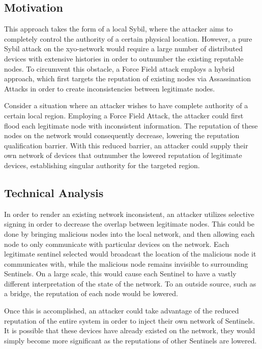 \documentclass{article}
\begin{document}
\subsection{Motivation}

This approach takes the form of a local Sybil, where the attacker aims to completely control the authority of a certain physical location. However, a pure Sybil attack on the \Gls{xyo-network} would require a large number of distributed devices with extensive histories in order to outnumber the existing reputable nodes. To circumvent this obstacle, a Force Field attack employs a hybrid approach, which first targets the reputation of existing nodes via Assassination Attacks in order to create inconsistencies between legitimate nodes.

Consider a situation where an attacker wishes to have complete authority of a certain local region. Employing a Force Field Attack, the attacker could first flood each legitimate node with inconsistent information. The reputation of these nodes on the network would consequently decrease, lowering the reputation qualification barrier. With this reduced barrier, an attacker could supply their own network of devices that outnumber the lowered reputation of legitimate devices, establishing singular authority for the targeted region. 

\subsection{Technical Analysis}

In order to render an existing network inconsistent, an attacker utilizes selective signing in order to decrease the overlap between legitimate nodes. This could be done by bringing malicious nodes into the local network, and then allowing each node to only communicate with particular devices on the network. Each legitimate \Gls{sentinel} selected would broadcast the location of the malicious node it communicates with, while the malicious node remains invisible to surrounding Sentinels. On a large scale, this would cause each Sentinel to have a vastly different interpretation of the state of the network. To an outside source, such as a \Gls{bridge}, the reputation of each node would be lowered.

Once this is accomplished, an attacker could take advantage of the reduced reputation of the entire system in order to inject their own network of Sentinels. It is possible that these devices have already existed on the network, they would simply become more significant as the reputations of other Sentinels are lowered.
\end{document}
